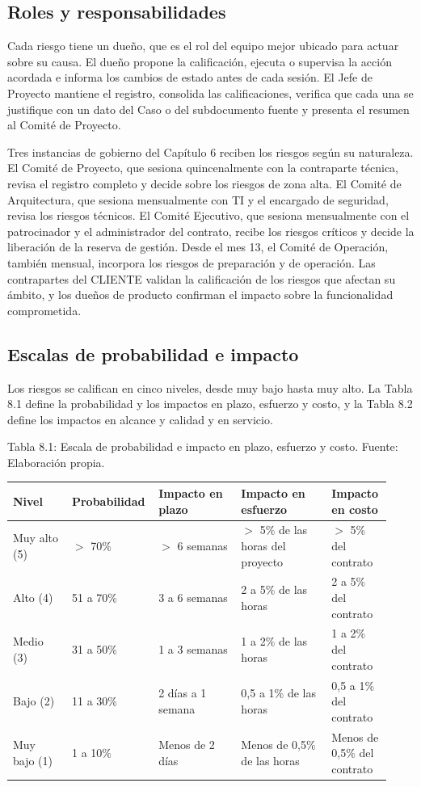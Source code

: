 \documentclass[11pt]{article}
\begin{document}
\subsection{Roles y responsabilidades}

Cada riesgo tiene un dueño, que es el rol del equipo mejor ubicado para actuar sobre su causa. El dueño propone la calificación, ejecuta o supervisa la acción acordada e informa los cambios de estado antes de cada sesión. El Jefe de Proyecto mantiene el registro, consolida las calificaciones, verifica que cada una se justifique con un dato del Caso o del subdocumento fuente y presenta el resumen al Comité de Proyecto.

Tres instancias de gobierno del Capítulo 6 reciben los riesgos según su naturaleza. El Comité de Proyecto, que sesiona quincenalmente con la contraparte técnica, revisa el registro completo y decide sobre los riesgos de zona alta. El Comité de Arquitectura, que sesiona mensualmente con TI y el encargado de seguridad, revisa los riesgos técnicos. El Comité Ejecutivo, que sesiona mensualmente con el patrocinador y el administrador del contrato, recibe los riesgos críticos y decide la liberación de la reserva de gestión. Desde el mes 13, el Comité de Operación, también mensual, incorpora los riesgos de preparación y de operación. Las contrapartes del CLIENTE validan la calificación de los riesgos que afectan su ámbito, y los dueños de producto confirman el impacto sobre la funcionalidad comprometida.

\subsection{Escalas de probabilidad e impacto}

Los riesgos se califican en cinco niveles, desde muy bajo hasta muy alto. La Tabla 8.1 define la probabilidad y los impactos en plazo, esfuerzo y costo, y la Tabla 8.2 define los impactos en alcance y calidad y en servicio.

Tabla 8.1: Escala de probabilidad e impacto en plazo, esfuerzo y costo. Fuente: Elaboración propia.\label{tab:8-1}

\begin{longtable}{p{0.158\linewidth}p{0.158\linewidth}p{0.218\linewidth}p{0.237\linewidth}p{0.158\linewidth}}
\toprule
\textbf{Nivel} & \textbf{Probabilidad} & \textbf{Impacto en plazo} & \textbf{Impacto en esfuerzo} & \textbf{Impacto en costo} \\
\midrule
\endhead
\bottomrule
\endlastfoot
Muy alto (5) & $>$ 70\% & $>$ 6 semanas & $>$ 5\% de las horas del proyecto & $>$ 5\% del contrato \\
Alto (4) & 51 a 70\% & 3 a 6 semanas & 2 a 5\% de las horas & 2 a 5\% del contrato \\
Medio (3) & 31 a 50\% & 1 a 3 semanas & 1 a 2\% de las horas & 1 a 2\% del contrato \\
Bajo (2) & 11 a 30\% & 2 días a 1 semana & 0,5 a 1\% de las horas & 0,5 a 1\% del contrato \\
Muy bajo (1) & 1 a 10\% & Menos de 2 días & Menos de 0,5\% de las horas & Menos de 0,5\% del contrato \\
\end{longtable}
\end{document}
